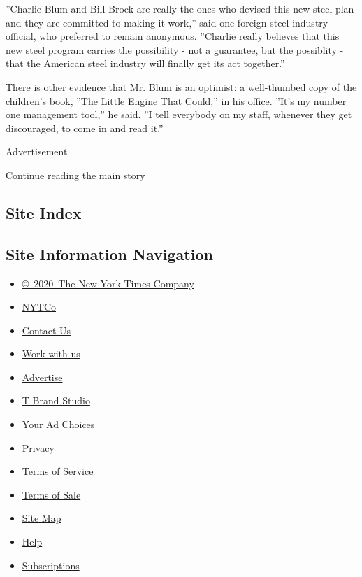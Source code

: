 ''Charlie Blum and Bill Brock are really the ones who devised this new
steel plan and they are committed to making it work,'' said one foreign
steel industry official, who preferred to remain anonymous. ''Charlie
really believes that this new steel program carries the possibility -
not a guarantee, but the possiblity - that the American steel industry
will finally get its act together.''

There is other evidence that Mr. Blum is an optimist: a well-thumbed
copy of the children's book, ''The Little Engine That Could,'' in his
office. ''It's my number one management tool,'' he said. ''I tell
everybody on my staff, whenever they get discouraged, to come in and
read it.''

Advertisement

\protect\hyperlink{after-bottom}{Continue reading the main story}

\hypertarget{site-index}{%
\subsection{Site Index}\label{site-index}}

\hypertarget{site-information-navigation}{%
\subsection{Site Information
Navigation}\label{site-information-navigation}}

\begin{itemize}
\tightlist
\item
  \href{https://help.nytimes.com/hc/en-us/articles/115014792127-Copyright-notice}{©~2020~The
  New York Times Company}
\end{itemize}

\begin{itemize}
\tightlist
\item
  \href{https://www.nytco.com/}{NYTCo}
\item
  \href{https://help.nytimes.com/hc/en-us/articles/115015385887-Contact-Us}{Contact
  Us}
\item
  \href{https://www.nytco.com/careers/}{Work with us}
\item
  \href{https://nytmediakit.com/}{Advertise}
\item
  \href{http://www.tbrandstudio.com/}{T Brand Studio}
\item
  \href{https://www.nytimes.com/privacy/cookie-policy\#how-do-i-manage-trackers}{Your
  Ad Choices}
\item
  \href{https://www.nytimes.com/privacy}{Privacy}
\item
  \href{https://help.nytimes.com/hc/en-us/articles/115014893428-Terms-of-service}{Terms
  of Service}
\item
  \href{https://help.nytimes.com/hc/en-us/articles/115014893968-Terms-of-sale}{Terms
  of Sale}
\item
  \href{https://spiderbites.nytimes.com}{Site Map}
\item
  \href{https://help.nytimes.com/hc/en-us}{Help}
\item
  \href{https://www.nytimes.com/subscription?campaignId=37WXW}{Subscriptions}
\end{itemize}
